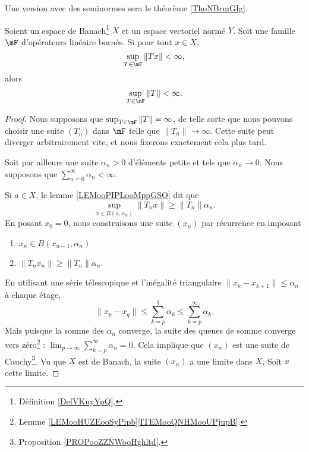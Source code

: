 Une version avec des seminormes sera le théorème \ref{ThoNBrmGIg}.
\begin{theorem}       \label{THOooJHVNooIDDxyT}
	Soient un espace de Banach\footnote{Définition \ref{DefVKuyYpQ}.} \( X\) et un espace vectoriel normé \( Y\). Soit une famille \( \mF\) d'opérateurs linéaire bornés. Si pour tout \( x\in  X\),
	\begin{equation}
		\sup_{T\in\mF}\| Tx \|<\infty,
	\end{equation}
	alors
	\begin{equation}
		\sup_{T\in \mF}\| T \|<\infty.
	\end{equation}
\end{theorem}

\begin{proof}
	Nous supposons que \( \sup_{T\in\mF}\| T \|=\infty\), de telle sorte que nous pouvons choisir une suite \( (T_n)\) dans \( \mF\) telle que \( \| T_n \|\to \infty\). Cette suite peut diverger arbitrairement vite, et nous fixerons exactement cela plus tard.

	Soit par ailleurs une suite \( \alpha_n>0\) d'éléments petits et tels que \( \alpha_n\to 0\). Nous supposons que \( \sum_{n=0}^{\infty}\alpha_n<\infty\).

	Si \( a\in X\), le lemme \ref{LEMooPIPLooMppGSO} dit que
	\begin{equation}
		\sup_{x\in B(a,\alpha_n)}\| T_nx \|\geq \| T_n \|\alpha_n.
	\end{equation}
	En posant \( x_0=0\), nous construisons une suite \( (x_n)\) par récurrence en imposant
	\begin{enumerate}
		\item
		      \( x_n\in B(x_{n-1}, \alpha_n)\)
		\item
		      \( \| T_nx_n \|\geq \| T_n \|\alpha_n\).
	\end{enumerate}
	En utilisant une série télescopique et l'inégalité triangulaire \( \| x_k-x_{k+1} \|\leq \alpha_n\) à chaque étage,
	\begin{equation}
		\| x_p-x_q \|\leq \sum_{k=p}^q\alpha_k\leq \sum_{k=p}^{\infty}\alpha_k.
	\end{equation}
	Mais puisque la somme des \( \alpha_n\) converge, la suite des queues de somme converge vers zéro\footnote{Lemme \ref{LEMooHUZEooSyPipb}\ref{ITEMooQNHMooUPjupB}.} : \( \lim_{p\to \infty}\sum_{k=p}^{\infty}\alpha_n=0\). Cela implique que \( (x_n)\) est une suite de Cauchy\footnote{Proposition \ref{PROPooZZNWooHghltd}.}. Vu que \( X\) est de Banach, la suite \( (x_n)\) a une limite dans \( X\). Soit \( x\) cette limite.


\end{proof}
